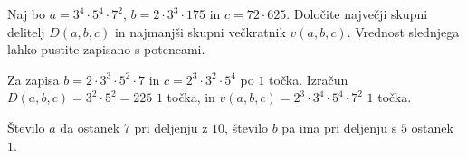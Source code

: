 \documentclass[addpoints]{exam}
\begin{document}
\begin{questions}


    \question[4]
    Naj bo $a=3^4\cdot 5^4\cdot 7^2$, $b=2\cdot 3^3\cdot 175$ in $c=72\cdot 625$. 
    Določite največji skupni delitelj $D(a,b,c)$ in najmanjši skupni večkratnik $v(a,b,c)$. Vrednost slednjega lahko pustite zapisano s potencami.

    \begin{solution}[6cm]
        Za zapisa $b=2\cdot 3^3\cdot 5^2\cdot 7$ in $c=2^3\cdot 3^2\cdot 5^4$ po $1$ točka. 
        Izračun $D(a,b,c)=3^2\cdot 5^2=225$ $1$ točka, in $v(a,b,c)=2^3\cdot 3^4\cdot 5^4\cdot 7^2$ $1$ točka.
    \end{solution}
    
    
    \question
    Število $a$ da ostanek $7$ pri deljenju z $10$, število $b$ pa ima pri deljenju s $5$ ostanek $1$.




     \newpage

    



\end{questions}
\end{document}
